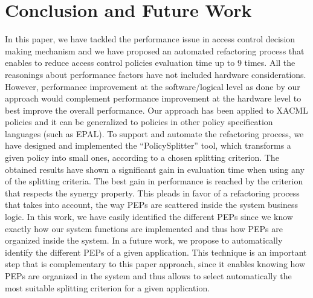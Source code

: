 \section{Conclusion and Future Work} \label{sec:conclusion}

In this paper, we have tackled the performance issue in access control decision making mechanism 
and we have proposed an automated refactoring process that enables to reduce access control policies evaluation time up to 9 times. 
All the reasonings about performance factors have not included hardware considerations. However, performance improvement at 
the software/logical level as done by our approach would complement performance improvement at the hardware level to best improve the overall performance. 
Our approach has been applied to XACML policies and it can be generalized to policies in other policy specification
languages (such as EPAL). 
To support and automate the refactoring process, we have designed and implemented the ``PolicySplitter'' tool,
which transforms a given policy into small ones, according to a chosen splitting criterion.
The obtained results have shown a significant gain in evaluation time when using any of the splitting criteria.
 The best gain in performance is reached by the criterion that respects the synergy property. This pleads in favor of a refactoring process that takes into
 account, the way PEPs are scattered inside the system business logic. 
In this work, we have easily identified the different PEPs since we know exactly how our system functions are
 implemented and thus how PEPs are organized inside the system. In a future work, we propose to automatically identify the different PEPs of a given application. 
This technique is an important step that is complementary to this paper approach, since it enables knowing how PEPs are organized in the system and thus allows to select automatically the most 
suitable splitting criterion for a given application. 